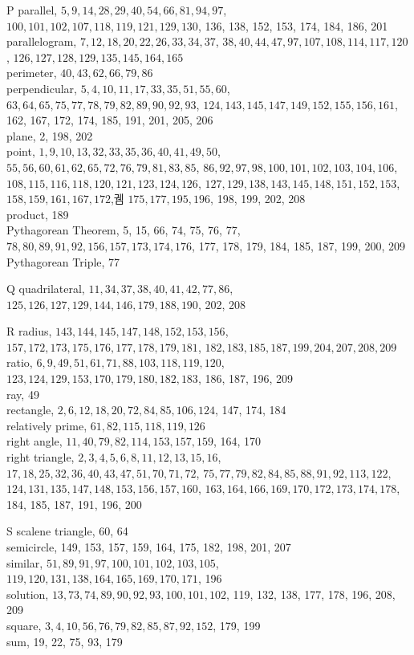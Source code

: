 \documentclass{article}
\begin{document}
P
parallel, \(5,9,14,28,29,40,54,66,81,94,97\), \(100,101,102,107,118,119,121,129,130\), 136, 138, 152, 153, 174, 184, 186, 201\\
parallelogram, \(7,12,18,20,22,26,33,34,37\), \(38,40,44,47,97,107,108,114,117,120\), \(126,127,128,129,135,145,164,165\)\\
perimeter, \(40,43,62,66,79,86\)\\
perpendicular, \(5,4,10,11,17,33,35,51,55,60\), \(63,64,65,75,77,78,79,82,89,90,92,93\), \(124,143,145,147,149,152,155,156,161\), 162, 167, 172, 174, 185, 191, 201, 205, 206\\
plane, 2, 198, 202\\
point, \(1,9,10,13,32,33,35,36,40,41,49,50\), \(55,56,60,61,62,65,72,76,79,81,83,85\), \(86,92,97,98,100,101,102,103,104,106\), \(108,115,116,118,120,121,123,124,126\), \(127,129,138,143,145,148,151,152,153\), \(158,159,161,167,172\),궴 \(175,177,195,196\), 198, 199, 202, 208\\
product, 189\\
Pythagorean Theorem, 5, 15, 66, 74, 75, 76, 77, \(78,80,89,91,92,156,157,173,174,176\), 177, 178, 179, 184, 185, 187, 199, 200, 209\\
Pythagorean Triple, 77

Q
quadrilateral, \(11,34,37,38,40,41,42,77,86\), \(125,126,127,129,144,146,179,188,190\), 202, 208

R
radius, \(143,144,145,147,148,152,153,156\), \(157,172,173,175,176,177,178,179,181\), \(182,183,185,187,199,204,207,208,209\)\\
ratio, \(6,9,49,51,61,71,88,103,118,119,120\), \(123,124,129,153,170,179,180,182,183\), 186, 187, 196, 209\\
ray, 49\\
rectangle, \(2,6,12,18,20,72,84,85,106,124\), 147, 174, 184\\
relatively prime, \(61,82,115,118,119,126\)\\
right angle, \(11,40,79,82,114,153,157,159\), 164, 170\\
right triangle, \(2,3,4,5,6,8,11,12,13,15,16\), \(17,18,25,32,36,40,43,47,51,70,71,72\), \(75,77,79,82,84,85,88,91,92,113,122\), \(124,131,135,147,148,153,156,157,160\), \(163,164,166,169,170,172,173,174,178\), 184, 185, 187, 191, 196, 200

S
scalene triangle, 60, 64\\
semicircle, 149, 153, 157, 159, 164, 175, 182, 198, 201, 207\\
similar, \(51,89,91,97,100,101,102,103,105\), \(119,120,131,138,164,165,169,170,171\), 196\\
solution, \(13,73,74,89,90,92,93,100,101,102\), 119, 132, 138, 177, 178, 196, 208, 209\\
square, \(3,4,10,56,76,79,82,85,87,92,152\), 179, 199\\
sum, 19, 22, 75, 93, 179
\end{document}
